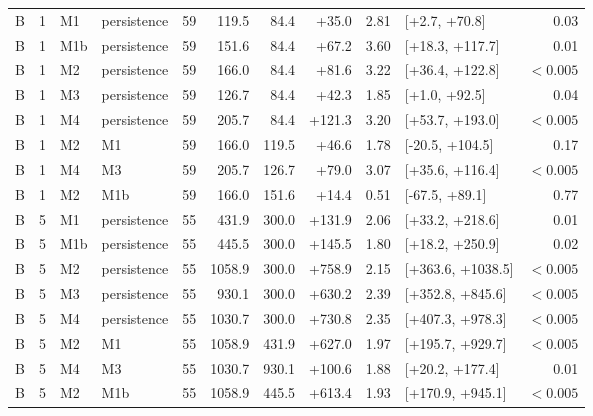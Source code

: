 \documentclass[preprint,11pt,authoryear]{elsarticle}
\theoremstyle{remark}
\begin{document}
\begin{table}[!htb]
\begin{tabular}{@{}ccllrrrrrlr@{}}
B & 1 & M1 & persistence & 59 & 119.5 & 84.4 & +35.0 & 2.81 & [+2.7, +70.8] & 0.03 \\
B & 1 & M1b & persistence & 59 & 151.6 & 84.4 & +67.2 & 3.60 & [+18.3, +117.7] & 0.01 \\
B & 1 & M2 & persistence & 59 & 166.0 & 84.4 & +81.6 & 3.22 & [+36.4, +122.8] & $<0.005$ \\
B & 1 & M3 & persistence & 59 & 126.7 & 84.4 & +42.3 & 1.85 & [+1.0, +92.5] & 0.04 \\
B & 1 & M4 & persistence & 59 & 205.7 & 84.4 & +121.3 & 3.20 & [+53.7, +193.0] & $<0.005$ \\
B & 1 & M2 & M1 & 59 & 166.0 & 119.5 & +46.6 & 1.78 & [-20.5, +104.5] & 0.17 \\
B & 1 & M4 & M3 & 59 & 205.7 & 126.7 & +79.0 & 3.07 & [+35.6, +116.4] & $<0.005$ \\
B & 1 & M2 & M1b & 59 & 166.0 & 151.6 & +14.4 & 0.51 & [-67.5, +89.1] & 0.77 \\
B & 5 & M1 & persistence & 55 & 431.9 & 300.0 & +131.9 & 2.06 & [+33.2, +218.6] & 0.01 \\
B & 5 & M1b & persistence & 55 & 445.5 & 300.0 & +145.5 & 1.80 & [+18.2, +250.9] & 0.02 \\
B & 5 & M2 & persistence & 55 & 1058.9 & 300.0 & +758.9 & 2.15 & [+363.6, +1038.5] & $<0.005$ \\
B & 5 & M3 & persistence & 55 & 930.1 & 300.0 & +630.2 & 2.39 & [+352.8, +845.6] & $<0.005$ \\
B & 5 & M4 & persistence & 55 & 1030.7 & 300.0 & +730.8 & 2.35 & [+407.3, +978.3] & $<0.005$ \\
B & 5 & M2 & M1 & 55 & 1058.9 & 431.9 & +627.0 & 1.97 & [+195.7, +929.7] & $<0.005$ \\
B & 5 & M4 & M3 & 55 & 1030.7 & 930.1 & +100.6 & 1.88 & [+20.2, +177.4] & 0.01 \\
B & 5 & M2 & M1b & 55 & 1058.9 & 445.5 & +613.4 & 1.93 & [+170.9, +945.1] & $<0.005$ \\
\bottomrule
\end{tabular}
\end{table}
\end{document}
